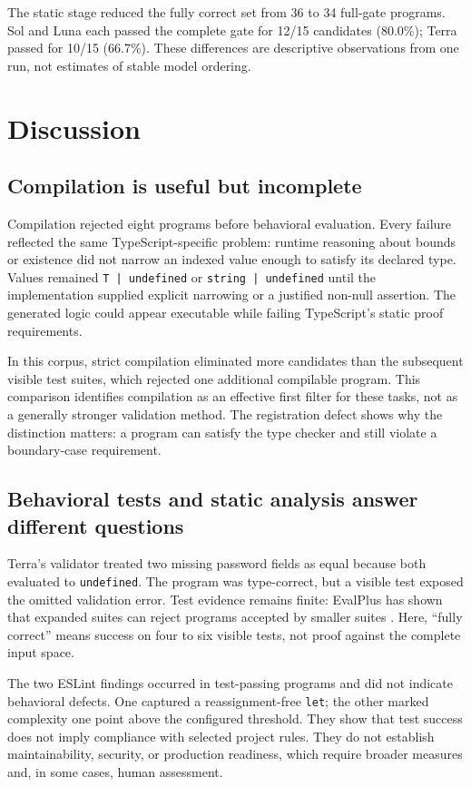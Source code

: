 \documentclass[conference]{IEEEtran}
\begin{document}
The static stage reduced the fully correct set from 36 to 34 full-gate programs. Sol and Luna each passed the complete gate for 12/15 candidates (80.0\%); Terra passed for 10/15 (66.7\%). These differences are descriptive observations from one run, not estimates of stable model ordering.

\section{Discussion}
\subsection{Compilation is useful but incomplete}
Compilation rejected eight programs before behavioral evaluation. Every failure reflected the same TypeScript-specific problem: runtime reasoning about bounds or existence did not narrow an indexed value enough to satisfy its declared type. Values remained \texttt{T | undefined} or \texttt{string | undefined} until the implementation supplied explicit narrowing or a justified non-null assertion. The generated logic could appear executable while failing TypeScript's static proof requirements.

In this corpus, strict compilation eliminated more candidates than the subsequent visible test suites, which rejected one additional compilable program. This comparison identifies compilation as an effective first filter for these tasks, not as a generally stronger validation method. The registration defect shows why the distinction matters: a program can satisfy the type checker and still violate a boundary-case requirement.

\subsection{Behavioral tests and static analysis answer different questions}
Terra's validator treated two missing password fields as equal because both evaluated to \texttt{undefined}. The program was type-correct, but a visible test exposed the omitted validation error. Test evidence remains finite: EvalPlus has shown that expanded suites can reject programs accepted by smaller suites \cite{liu2023evalplus}. Here, ``fully correct'' means success on four to six visible tests, not proof against the complete input space.

The two ESLint findings occurred in test-passing programs and did not indicate behavioral defects. One captured a reassignment-free \texttt{let}; the other marked complexity one point above the configured threshold. They show that test success does not imply compliance with selected project rules. They do not establish maintainability, security, or production readiness, which require broader measures and, in some cases, human assessment.
\end{document}
